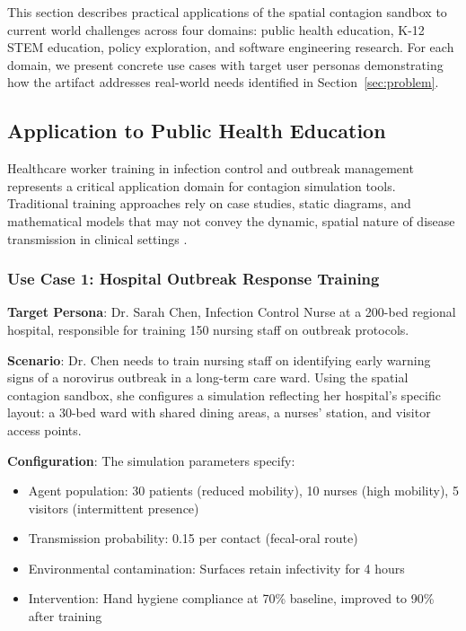 \label{sec:applications}

This section describes practical applications of the spatial contagion sandbox to current world challenges across four domains: public health education, K-12 STEM education, policy exploration, and software engineering research. For each domain, we present concrete use cases with target user personas demonstrating how the artifact addresses real-world needs identified in Section~\ref{sec:problem}.

\subsection{Application to Public Health Education}

Healthcare worker training in infection control and outbreak management represents a critical application domain for contagion simulation tools. Traditional training approaches rely on case studies, static diagrams, and mathematical models that may not convey the dynamic, spatial nature of disease transmission in clinical settings \cite{bennett2015simulation}.

\subsubsection{Use Case 1: Hospital Outbreak Response Training}

\textbf{Target Persona}: Dr. Sarah Chen, Infection Control Nurse at a 200-bed regional hospital, responsible for training 150 nursing staff on outbreak protocols.

\textbf{Scenario}: Dr. Chen needs to train nursing staff on identifying early warning signs of a norovirus outbreak in a long-term care ward. Using the spatial contagion sandbox, she configures a simulation reflecting her hospital's specific layout: a 30-bed ward with shared dining areas, a nurses' station, and visitor access points.

\textbf{Configuration}: The simulation parameters specify:
\begin{itemize}
    \item Agent population: 30 patients (reduced mobility), 10 nurses (high mobility), 5 visitors (intermittent presence)
    \item Transmission probability: 0.15 per contact (fecal-oral route)
    \item Environmental contamination: Surfaces retain infectivity for 4 hours
    \item Intervention: Hand hygiene compliance at 70\% baseline, improved to 90\% after training
\end{itemize}

